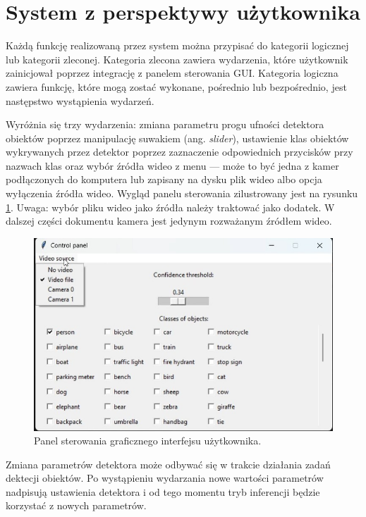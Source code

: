\section{System z perspektywy użytkownika}
\label{chap:uzytkownik-gui}
Każdą funkcję realizowaną przez system można przypisać do kategorii logicznej lub kategorii zleconej. Kategoria zlecona zawiera wydarzenia, które użytkownik zainicjował poprzez integrację z panelem sterowania GUI. Kategoria logiczna zawiera funkcję, które mogą zostać wykonane, pośrednio lub bezpośrednio, jest następstwo wystąpienia wydarzeń.

Wyróżnia się trzy wydarzenia: zmiana parametru progu ufności detektora obiektów poprzez manipulację suwakiem (ang. \emph{slider}), ustawienie klas obiektów wykrywanych przez detektor poprzez zaznaczenie odpowiednich przycisków przy nazwach klas oraz wybór źródła wideo z menu --- może to być jedna z kamer podłączonych do komputera lub zapisany na dysku plik wideo albo opcja wyłączenia źródła wideo. Wygląd panelu sterowania zilustrowany jest na rysunku \ref{fig:panel-sterowania}. 
Uwaga: wybór pliku wideo jako źródła należy traktować jako dodatek. W dalszej części dokumentu kamera jest jedynym rozważanym źródłem wideo.   

\begin{figure}[H]
    \centering
    \includegraphics[width=\linewidth]{r_implementacja/panel_sterowania/panel.jpg}
    \caption{Panel sterowania graficznego interfejsu użytkownika.}
    \label{fig:panel-sterowania}
\end{figure}

Zmiana parametrów detektora może odbywać się w trakcie działania zadań dektecji obiektów. Po wystąpieniu wydarzania nowe wartości parametrów nadpisują ustawienia detektora i od tego momentu tryb inferencji będzie korzystać z nowych parametrów.

